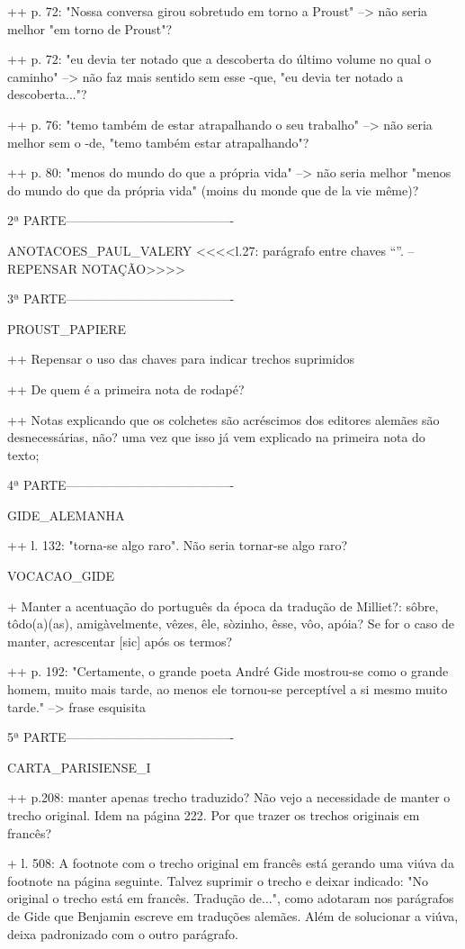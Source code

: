 ++ p. 72: "Nossa conversa girou sobretudo em torno a Proust" --> não seria melhor "em torno de Proust"?

++ p. 72: "eu devia ter notado que a descoberta do último volume no qual o caminho" --> não faz mais sentido sem esse -que, "eu devia ter notado a descoberta..."?

++ p. 76: "temo também de estar atrapalhando o seu trabalho" --> não seria melhor sem o -de, "temo também estar atrapalhando"?

++ p. 80: "menos do mundo do que a própria vida" --> não seria melhor "menos do mundo do que da própria vida" (moins du monde que de la vie même)?

2ª PARTE----------------------------------------


ANOTACOES_PAUL_VALERY
<<<<l.27: parágrafo entre chaves ``{}''. -- REPENSAR NOTAÇÃO>>>>


3ª PARTE----------------------------------------


PROUST_PAPIERE

++ Repensar o uso das chaves para indicar trechos suprimidos

++ De quem é a primeira nota de rodapé?

++ Notas explicando que os colchetes são acréscimos dos editores alemães são desnecessárias, não? uma vez que isso já vem explicado na primeira nota do texto;

4ª PARTE----------------------------------------

GIDE_ALEMANHA

++ l. 132: "torna-se algo raro". Não seria tornar-se algo raro?


VOCACAO_GIDE

+ Manter a acentuação do português da época da tradução de Milliet?: sôbre, tôdo(a)(as), amigàvelmente, vêzes, êle, sòzinho, êsse, vôo, apóia? Se for o caso de manter, acrescentar [sic] após os termos?

++ p. 192: "Certamente, o grande poeta André Gide mostrou-se como o
grande homem, muito mais tarde, ao menos ele tornou-se
perceptível a si mesmo muito tarde." --> frase esquisita


5ª PARTE----------------------------------------

CARTA_PARISIENSE_I

++ p.208: manter apenas trecho traduzido? Não vejo a necessidade de manter o trecho original. Idem na página 222. Por que trazer os trechos originais em francês?

+ l. 508: A footnote com o trecho original em francês está gerando uma viúva da footnote na página seguinte. Talvez suprimir o trecho e deixar indicado: "No original o trecho está em francês. Tradução de...", como adotaram nos parágrafos de Gide que Benjamin escreve em traduções alemães. Além de solucionar a viúva, deixa padronizado com o outro parágrafo.
